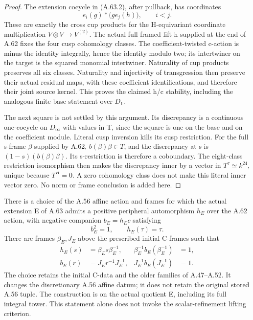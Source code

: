 \begin{proof}
The extension cocycle in (A.63.2), after pullback,
has coordinates
\[
 e_i(g)*\bigl(g e_j(h)\bigr),\qquad i<j.
 \tag{A.63.9}
\]
These are exactly the cross cup products for the
H-equivariant coordinate multiplication
\(V\otimes V\to V^{(2)}\). The actual full framed
lift h supplied at the end of A.62 fixes the four
cusp cohomology classes. The coefficient-twisted
c-action is minus the identity integrally, hence
the identity modulo two; its intertwiner on the
target is the squared monomial intertwiner.
Naturality of cup products preserves all six
classes. Naturality and injectivity of transgression
then preserve their actual residual maps, with
these coefficient identifications, and therefore
their joint source kernel. This proves the claimed
h/c stability, including the analogous finite-base
statement over \(D_1\).

The next square is not settled by this argument.
Its discrepancy is a continuous one-cocycle on
\(D_\infty\) with values in T, since the square is
one on the base and on the coefficient module.
Literal cusp inversion kills its cusp restriction.
For the full s-frame \(\beta\) supplied by A.62,
\(b(\beta)\beta\in T\), and the discrepancy at s is
\((1-s)(b(\beta)\beta)\). Its s-restriction is therefore
a coboundary. The eight-class restriction isomorphism
then makes the discrepancy inner by a vector in
\(T^\tau\simeq k^{24}\), unique because \(T^H=0\).
A zero cohomology class does not make this literal
inner vector zero. No norm or frame conclusion is
added here.
\end{proof}

There is a choice of the A.56 affine action and frames for which the
actual extension E of A.63 admits a positive peripheral automorphism \(h_E\)
over the A.62 action, with negative companion \(b_E=h_Ec\) satisfying
\[
 b_E^2=1,\qquad h_E(\tau)=\tau.
 \tag{A.64.1}
\]
There are frames \(\beta_E,J_E\) above the prescribed initial C-frames
such that
\[
 \begin{aligned}
 h_E(s)&=\beta_Es\beta_E^{-1},&
 \beta_E^{-1}b_E(\beta_E^{-1})&=1,\\
 b_E(r)&=J_Er^{-1}J_E^{-1},&
 J_E^{-1}b_E(J_E^{-1})&=1.
 \end{aligned}
 \tag{A.64.2}
\]
The choice retains the initial C-data and the older families of
A.47--A.52. It changes the discretionary A.56 affine datum; it does
not retain the original stored A.56 tuple. The construction is on
the actual quotient E, including its full integral tower. This
statement alone does not invoke the scalar-refinement lifting criterion.

